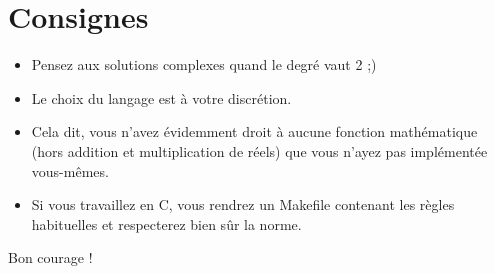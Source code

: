 \documentclass{42}
\begin{document}
\chapter{Consignes}
\begin{flushleft}
	\begin{itemize}
		\item Pensez aux solutions complexes quand le degré vaut 2 ;)
		\item Le choix du langage est à votre discrétion.

		\item Cela dit, vous n'avez évidemment droit à aucune fonction mathématique (hors addition et multiplication de réels) que vous n'ayez pas implémentée vous-mêmes.

		\item Si vous travaillez en C, vous rendrez un Makefile contenant les règles habituelles et respecterez bien sûr la norme.
	\end{itemize}
\end{flushleft}
Bon courage !

\end{document}
